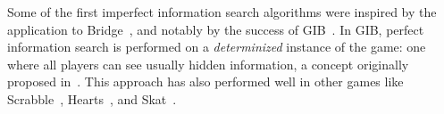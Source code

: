 \documentclass[letterpaper]{article}
\newcounter{vlNoteCounter}
\newcommand{\vlnote}[1]{{\scriptsize \color{blue} $\blacksquare$ \refstepcounter{vlNoteCounter}\textsf{[VL]$_{\arabic{vlNoteCounter}}$:{#1}}}}
\begin{document}


Some of the first imperfect information search algorithms were inspired by the application to 
Bridge~\cite{Frank98Finding,Ginsberg96Partition}, and notably by the success of GIB~\cite{Ginsberg01}.
In GIB, perfect information search is performed on a {\it determinized} 
instance of the game: one where all players can see usually hidden information, a concept 
originally proposed in~\cite{Levy89Heuristic}. This approach has also performed well in other 
games like Scrabble~\cite{Sheppard02World}, Hearts~\cite{Sturtevant08An}, and Skat~\cite{Buro09Improving}. 
\end{document}
